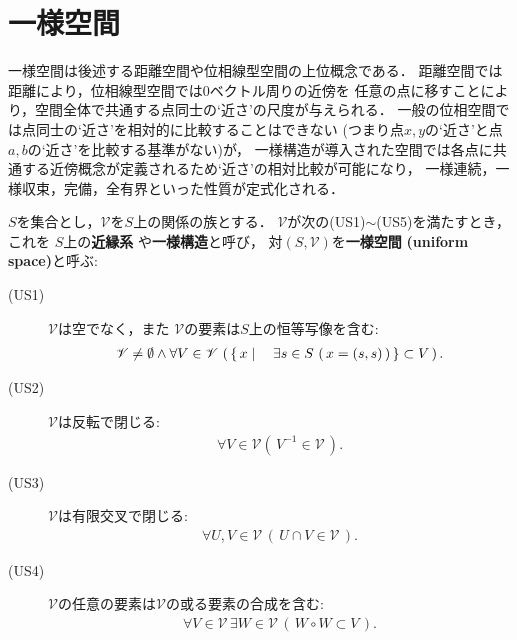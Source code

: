 \section{一様空間}
	一様空間は後述する距離空間や位相線型空間の上位概念である．
	距離空間では距離により，位相線型空間では$0$ベクトル周りの近傍を
	任意の点に移すことにより，空間全体で共通する点同士の`近さ'の尺度が与えられる．
	一般の位相空間では点同士の`近さ'を相対的に比較することはできない
	(つまり点$x,y$の`近さ'と点$a,b$の`近さ'を比較する基準がない)が，
	一様構造が導入された空間では各点に共通する近傍概念が定義されるため`近さ'の相対比較が可能になり，
	一様連続，一様収束，完備，全有界といった性質が定式化される．
	
	\begin{screen}
		\begin{dfn}[近縁系]\label{dfn:uniform_structure}
			$S$を集合とし，$\mathscr{V}$を$S$上の関係の族とする．
			$\mathscr{V}$が次の(US1)$\sim$(US5)を満たすとき，これを
			$S$上の{\bf 近縁系}
			や{\bf 一様構造}と呼び，
			対$(S,\mathscr{V})$を{\bf 一様空間}
			{\bf (uniform space)}と呼ぶ:
			\begin{description}
				\item[(US1)] $\mathscr{V}$は空でなく，また
					$\mathscr{V}$の要素は$S$上の恒等写像を含む:
					\begin{align}
						\mathscr{V} \neq \emptyset
						\wedge \forall V \in \mathscr{V}\,
						\left(\, \left\{\, x \mid \quad \exists s \in S\, \left(\, x=(s,s)\, \right)\, \right\} \subset V\, \right).
					\end{align}
					
				\item[(US2)] $\mathscr{V}$は反転で閉じる:
					\begin{align}
						\forall V \in \mathscr{V} 
						\left(\, V^{-1} \in \mathscr{V}\, \right).
					\end{align}
					
				\item[(US3)] $\mathscr{V}$は有限交叉で閉じる:
					\begin{align}
						\forall U,V \in \mathscr{V}\, \left(\, 
						U \cap V \in \mathscr{V}\, \right).
					\end{align}
					
				\item[(US4)] $\mathscr{V}$の任意の要素は$\mathscr{V}$の或る要素の合成を含む:
					\begin{align}
						\forall V \in \mathscr{V}\, 
						\exists W \in \mathscr{V}\,
						\left(\, W \circ W \subset V\, \right). 
					\end{align}
					

\end{description}
\end{dfn}
\end{screen}
